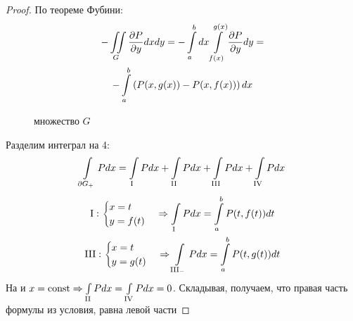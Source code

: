 \begin{proof}
	По теореме Фубини:
	\begin{gather*} 
		-\iint\limits_{G} \frac{\partial P}{\partial y} dxdy = 
		-\int\limits_{a}^{b}dx\int\limits_{f(x)}^{g(x)} \frac{\partial P}{\partial y} dy = \\
		-\int\limits_{a}^{b}\left( P(x, g(x)) - P(x, f(x)) \right) dx
	\end{gather*}
	\begin{figure}[h]
	\centering
	\caption{множество $G$}
	\end{figure}
	Разделим интеграл на 4:
	\begin{gather*}
		\intl{\partial G_{+}} P dx = \intl{\text{\rom{1}}}Pdx + 
		\intl{\text{\rom{2}}}Pdx + \intl{\text{\rom{3}}}Pdx + \intl{\text{\rom{4}}}Pdx
	\end{gather*}
	\begin{gather*}
		\text{\rom{1}}: \begin{cases}
							x = t \\ 
							y = f(t)
						\end{cases} 
		\Rightarrow
		\intl{\text{\rom{1}}} P dx = \intlr{a}{b} P(t, f(t)) dt \\
		\text{\rom{3}}: \begin{cases}
							x = t \\ 
							y = g(t)
						\end{cases} 
		\Rightarrow
		\intl{\text{\rom{3}}_{-}} P dx = \intlr{a}{b} P(t, g(t)) dt 
	\end{gather*}
	На  и  $x = \text{const} \Rightarrow \intl{\text{\rom{2}}} Pdx = 
	\intl{\text{\rom{4}}}Pdx = 0$.
	Складывая, получаем, что правая часть формулы из условия, равна левой части
\end{proof}


